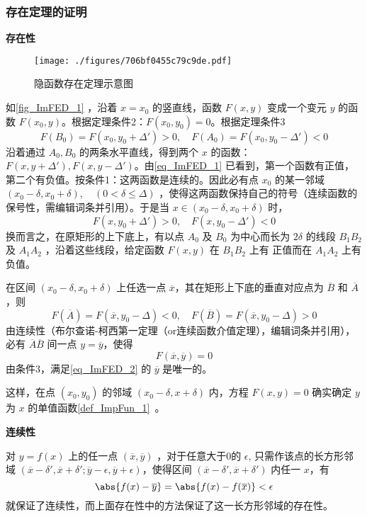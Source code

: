 \subsubsection{存在定理的证明}
\textbf{存在性}
\begin{figure}[ht]
\centering
\texttt{[image: ./figures/706bf0455c79c9de.pdf]}
\caption{隐函数存在定理示意图} \label{fig_ImFED_1}
\end{figure}
如\autoref{fig_ImFED_1} ，沿着 $x=x_0$ 的竖直线，函数 $F(x,y)$ 变成一个变元 $y$ 的函数 $F(x_0,y)$。根据定理条件2：$F(x_0,y_0)=0$。根据定理条件3
\begin{equation}\label{eq_ImFED_1}
F(B_0)=F(x_0,y_0+\Delta')>0,\quad F(A_0)=F(x_0,y_0-\Delta')<0
\end{equation}
沿着通过 $A_0,B_0$ 的两条水平直线，得到两个 $x$ 的函数：$F(x,y+\Delta'),F(x,y-\Delta')$。由\autoref{eq_ImFED_1} 已看到，第一个函数有正值，第二个有负值。按条件1：这两函数是连续的。因此必有点 $x_0$ 的某一邻域 $(x_0-\delta,x_0+\delta),\quad(0<\delta\leq\Delta)$ ，使得这两函数保持自己的符号（连续函数的保号性，需编辑词条并引用）。于是当 $x\in(x_0-\delta,x_0+\delta)$ 时，
\begin{equation}
F(x,y_0+\Delta')>0,\quad F(x,y_0-\Delta')<0
\end{equation}
换而言之，在原矩形的上下底上，有以点 $A_0$ 及 $B_0$ 为中心而长为 $2\delta$ 的线段  $B_1B_2$ 及 $A_1A_2$ ，沿着这些线段，给定函数 $F(x,y)$ 在 $B_1B_2$ 上有 正值而在 $A_1A_2$ 上有负值。

在区间 $(x_0-\delta,x_0+\delta)$ 上任选一点 $\overline{x}$，其在矩形上下底的垂直对应点为 $\overline{B}$ 和 $\overline{A}$，则
\begin{equation}
F(\overline{A})=F(\overline{x},y_0-\Delta)<0,\quad F(\overline{B})=F(\overline{x},y_0-\Delta)>0
\end{equation}
由连续性（布尔查诺-柯西第一定理（or连续函数介值定理），编辑词条并引用），必有 $\overline{A}\overline{B}$ 间一点 $y=\overline{y}$，使得
\begin{equation}\label{eq_ImFED_2}
F(\overline{x},\overline{y})=0
\end{equation}
由条件3，满足\autoref{eq_ImFED_2} 的 $\overline{y}$ 是唯一的。

这样，在点 $(x_0,y_0)$ 的邻域 $(x_0-\delta,x+\delta)$ 内，方程 $F(x,y)=0$ 确实确定 $y$ 为 $x$ 的单值函数\autoref{def_ImpFun_1}~。

\textbf{连续性}

对 $y=f(x)$ 上的任一点 $(\overline{x},\overline{y})$ ，对于任意大于0的 $\epsilon$, 只需作该点的长方形邻域 $(\overline{x}-\delta',\overline{x}+\delta';\overline{y}-\epsilon,\overline{y}+\epsilon)$，使得区间 $(\overline{x}-\delta',\overline{x}+\delta')$ 内任一 $x$，有
\begin{equation}
\abs{f(x)-\overline{y}}=\abs{f(x)-f(\overline{x})}<\epsilon
\end{equation}
就保证了连续性，而上面存在性中的方法保证了这一长方形邻域的存在性。

